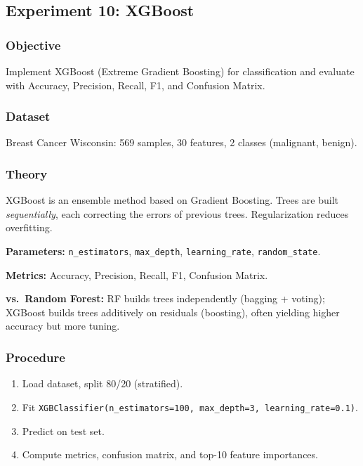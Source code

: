 \documentclass[a4paper,10pt]{article}
\begin{document}
\subsection{Experiment 10: XGBoost}

\subsubsection{Objective}
Implement XGBoost (Extreme Gradient Boosting) for classification and evaluate with Accuracy, Precision, Recall, F1, and Confusion Matrix.

\subsubsection{Dataset}
Breast Cancer Wisconsin: 569 samples, 30 features, 2 classes (malignant, benign).

\subsubsection{Theory}
XGBoost is an ensemble method based on Gradient Boosting. Trees are built \emph{sequentially}, each correcting the errors of previous trees. Regularization reduces overfitting.

\textbf{Parameters:} \texttt{n\_estimators}, \texttt{max\_depth}, \texttt{learning\_rate}, \texttt{random\_state}.

\textbf{Metrics:} Accuracy, Precision, Recall, F1, Confusion Matrix.

\textbf{vs.\ Random Forest:} RF builds trees independently (bagging + voting); XGBoost builds trees additively on residuals (boosting), often yielding higher accuracy but more tuning.

\subsubsection{Procedure}
\begin{enumerate}[nosep]
    \item Load dataset, split 80/20 (stratified).
    \item Fit \texttt{XGBClassifier(n\_estimators=100, max\_depth=3, learning\_rate=0.1)}.
    \item Predict on test set.
    \item Compute metrics, confusion matrix, and top-10 feature importances.
\end{enumerate}
\end{document}
